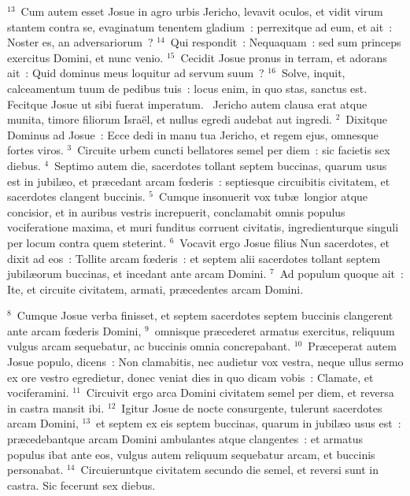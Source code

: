 ${}^{13}$~Cum autem esset Josue in agro urbis Jericho, levavit oculos, et vidit virum stantem contra se, evaginatum tenentem gladium~: perrexitque ad eum, et ait~: Noster es, an adversariorum~?
${}^{14}$~Qui respondit~: Nequaquam~: sed sum princeps exercitus Domini, et nunc venio.
${}^{15}$~Cecidit Josue pronus in terram, et adorans ait~: Quid dominus meus loquitur ad servum suum~?
${}^{16}$~Solve, inquit, calceamentum tuum de pedibus tuis~: locus enim, in quo stas, sanctus est. Fecitque Josue ut sibi fuerat imperatum.
~\lettrine[lines=10,image=true,loversize=0.05,lraise=-0.03]{J}{}ericho autem clausa erat atque munita, timore filiorum Isra\"el, et nullus egredi audebat aut ingredi.
${}^{2}$~Dixitque Dominus ad Josue~: Ecce dedi in manu tua Jericho, et regem ejus, omnesque fortes viros.
${}^{3}$~Circuite urbem cuncti bellatores semel per diem~: sic facietis sex diebus.
${}^{4}$~Septimo autem die, sacerdotes tollant septem buccinas, quarum usus est in jubil\ae o, et pr\ae cedant arcam fœderis~: septiesque circuibitis civitatem, et sacerdotes clangent buccinis.
${}^{5}$~Cumque insonuerit vox tub\ae\ longior atque concisior, et in auribus vestris increpuerit, conclamabit omnis populus vociferatione maxima, et muri funditus corruent civitatis, ingredienturque singuli per locum contra quem steterint.
${}^{6}$~Vocavit ergo Josue filius Nun sacerdotes, et dixit ad eos~: Tollite arcam fœderis~: et septem alii sacerdotes tollant septem jubil\ae orum buccinas, et incedant ante arcam Domini.
${}^{7}$~Ad populum quoque ait~: Ite, et circuite civitatem, armati, pr\ae cedentes arcam Domini.


${}^{8}$~Cumque Josue verba finisset, et septem sacerdotes septem buccinis clangerent ante arcam fœderis Domini,
${}^{9}$~omnisque pr\ae cederet armatus exercitus, reliquum vulgus arcam sequebatur, ac buccinis omnia concrepabant.
${}^{10}$~Pr\ae ceperat autem Josue populo, dicens~: Non clamabitis, nec audietur vox vestra, neque ullus sermo ex ore vestro egredietur, donec veniat dies in quo dicam vobis~: Clamate, et vociferamini.
${}^{11}$~Circuivit ergo arca Domini civitatem semel per diem, et reversa in castra mansit ibi.
${}^{12}$~Igitur Josue de nocte consurgente, tulerunt sacerdotes arcam Domini,
${}^{13}$~et septem ex eis septem buccinas, quarum in jubil\ae o usus est~: pr\ae cedebantque arcam Domini ambulantes atque clangentes~: et armatus populus ibat ante eos, vulgus autem reliquum sequebatur arcam, et buccinis personabat.
${}^{14}$~Circuieruntque civitatem secundo die semel, et reversi sunt in castra. Sic fecerunt sex diebus.


